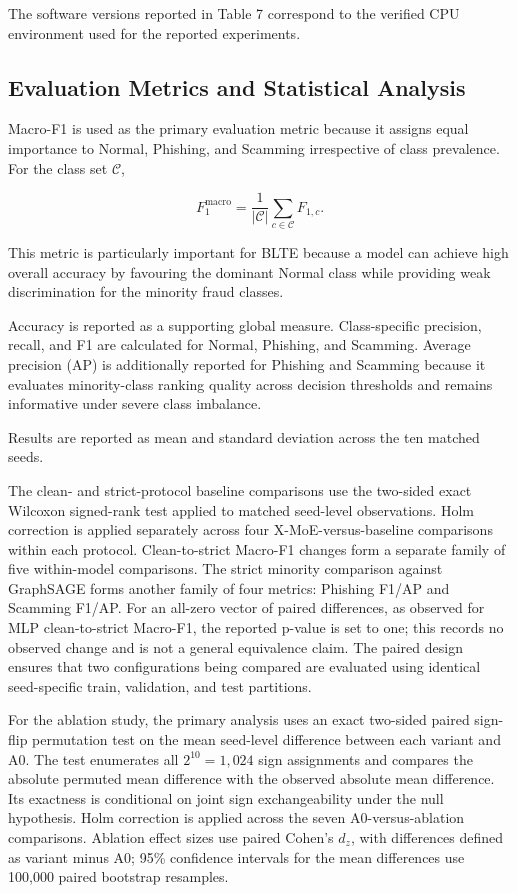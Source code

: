 \documentclass{ieeeaccess}
\begin{document}
The software versions reported in Table 7 correspond to the verified CPU environment used for the reported experiments.

\subsection{Evaluation Metrics and Statistical Analysis}

Macro-F1 is used as the primary evaluation metric because it assigns equal importance to Normal, Phishing, and Scamming irrespective of class prevalence. For the class set \(\mathcal{C}\),

\begin{equation}
F_{1}^{\mathrm{macro}}
=
\frac{1}{|\mathcal{C}|}
\sum_{c\in\mathcal{C}}
F_{1,c}.
\label{eq:macro_f1}
\end{equation}

This metric is particularly important for BLTE because a model can achieve high overall accuracy by favouring the dominant Normal class while providing weak discrimination for the minority fraud classes.

Accuracy is reported as a supporting global measure. Class-specific precision, recall, and F1 are calculated for Normal, Phishing, and Scamming. Average precision (AP) is additionally reported for Phishing and Scamming because it evaluates minority-class ranking quality across decision thresholds and remains informative under severe class imbalance.

Results are reported as mean and standard deviation across the ten matched seeds.

The clean- and strict-protocol baseline comparisons use the two-sided exact Wilcoxon signed-rank test applied to matched seed-level observations. Holm correction is applied separately across four X-MoE-versus-baseline comparisons within each protocol. Clean-to-strict Macro-F1 changes form a separate family of five within-model comparisons. The strict minority comparison against GraphSAGE forms another family of four metrics: Phishing F1/AP and Scamming F1/AP. For an all-zero vector of paired differences, as observed for MLP clean-to-strict Macro-F1, the reported p-value is set to one; this records no observed change and is not a general equivalence claim. The paired design ensures that two configurations being compared are evaluated using identical seed-specific train, validation, and test partitions.

For the ablation study, the primary analysis uses an exact two-sided paired sign-flip permutation test on the mean seed-level difference between each variant and A0. The test enumerates all $2^{10}=1{,}024$ sign assignments and compares the absolute permuted mean difference with the observed absolute mean difference. Its exactness is conditional on joint sign exchangeability under the null hypothesis. Holm correction is applied across the seven A0-versus-ablation comparisons. Ablation effect sizes use paired Cohen's $d_z$, with differences defined as variant minus A0; 95\% confidence intervals for the mean differences use 100{,}000 paired bootstrap resamples.
\end{document}
